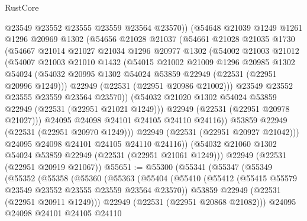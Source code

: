 \begin{lexlean}{RustCore}
\begin{coremodule}
              @23549
              @23552
              @23555
              @23559
              @23564
              @23570))
          (@54648
            @21039
            @1249
            @1261
            @1296
            @20969
            @1302
            (@54656
              @21028
              @21037
              (@54661
                @21028
                @21035
                @1730
                (@54667
                  @21014
                  @21027
                  @21034
                  @1296
                  @20977
                  @1302
                  (@54002
                    @21003
                    @21012
                    (@54007
                      @21003
                      @21010
                      @1432
                      (@54015
                        @21002
                        @21009
                        @1296
                        @20985
                        @1302
                        @54024
                        (@54032 @20995 @1302 @54024 @53859 @22949 (@22531 (@22951 @20996 @1249)))
                        @22949
                        (@22531 (@22951 @20986 @21002)))
                      @23549
                      @23552
                      @23555
                      @23559
                      @23564
                      @23570))
                  (@54032 @21020 @1302 @54024 @53859 @22949 (@22531 (@22951 @21021 @1249)))
                  @22949
                  (@22531 (@22951 @20978 @21027)))
                @24095
                @24098
                @24101
                @24105
                @24110
                @24116))
            @53859
            @22949
            (@22531 (@22951 @20970 @1249)))
          @22949
          (@22531 (@22951 @20927 @21042)))
        @24095
        @24098
        @24101
        @24105
        @24110
        @24116))
    (@54032 @21060 @1302 @54024 @53859 @22949 (@22531 (@22951 @21061 @1249)))
    @22949
    (@22531 (@22951 @20919 @21067))
@55651 := @55300
    (@55341
      (@55347
        (@55349
          (@55352
            (@55358
              (@55360
                (@55363
                  (@55404
                    (@55410
                      (@55412 (@55415 @55579 @23549 @23552 @23555 @23559 @23564 @23570))
                      @53859
                      @22949
                      (@22531 (@22951 @20911 @1249)))
                    @22949
                    (@22531 (@22951 @20868 @21082)))
                  @24095
                  @24098
                  @24101
                  @24105
                  @24110

\end{coremodule}
\end{lexlean}
